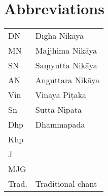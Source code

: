 \chapter*{Abbreviations}


\begin{tabular}{@{} l l @{}}
DN & Dīgha Nikāya \\
MN & Majjhima Nikāya \\
SN & Saṃyutta Nikāya \\
AN & Anguttara Nikāya \\
Vin & Vinaya Piṭaka \\
Sn & Sutta Nipāta \\
Dhp & Dhammapada \\
Khp & \\
J & \\
MJG & \\
Trad. & Traditional chant\\
\end{tabular}

%

